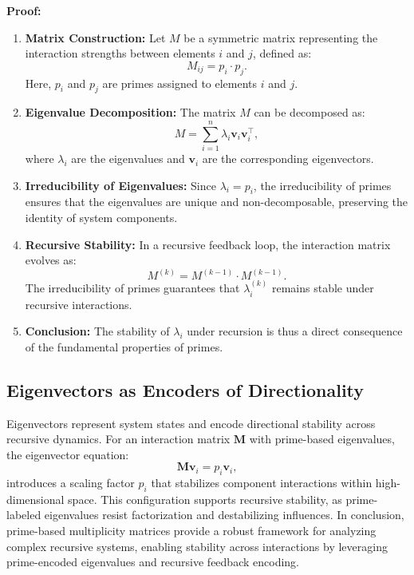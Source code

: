 \documentclass{article}
\theoremstyle{plain}
\begin{document}
\textbf{Proof:}
\begin{enumerate}
    \item \textbf{Matrix Construction:} Let $M$ be a symmetric matrix representing the interaction strengths between elements $i$ and $j$, defined as:
    \begin{equation}
    M_{ij} = p_i \cdot p_j.
    \end{equation}
    Here, $p_i$ and $p_j$ are primes assigned to elements $i$ and $j$.
    
    \item \textbf{Eigenvalue Decomposition:} The matrix $M$ can be decomposed as:
    \begin{equation}
    M = \sum_{i=1}^n \lambda_i \mathbf{v}_i \mathbf{v}_i^\top,
    \end{equation}
    where $\lambda_i$ are the eigenvalues and $\mathbf{v}_i$ are the corresponding eigenvectors.

    \item \textbf{Irreducibility of Eigenvalues:} Since $\lambda_i = p_i$, the irreducibility of primes ensures that the eigenvalues are unique and non-decomposable, preserving the identity of system components.

    \item \textbf{Recursive Stability:} In a recursive feedback loop, the interaction matrix evolves as:
   \begin{equation}
    M^{(k)} = M^{(k-1)} \cdot M^{(k-1)}.
    \end{equation}
    The irreducibility of primes guarantees that $\lambda_i^{(k)}$ remains stable under recursive interactions.
    
    \item \textbf{Conclusion:} The stability of $\lambda_i$ under recursion is thus a direct consequence of the fundamental properties of primes.
\end{enumerate}

\subsection{Eigenvectors as Encoders of Directionality}
Eigenvectors represent system states and encode directional stability across recursive dynamics. For an interaction matrix \( \mathbf{M} \) with prime-based eigenvalues, the eigenvector equation:
\begin{equation}
\mathbf{M} \mathbf{v}_i = p_i \mathbf{v}_i,
\end{equation}
introduces a scaling factor \( p_i \) that stabilizes component interactions within high-dimensional space. This configuration supports recursive stability, as prime-labeled eigenvalues resist factorization and destabilizing influences. In conclusion, prime-based multiplicity matrices provide a robust framework for analyzing complex recursive systems, enabling stability across interactions by leveraging prime-encoded eigenvalues and recursive feedback encoding.
\end{document}
